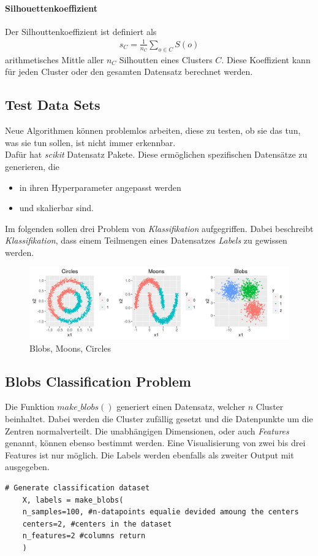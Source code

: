 \paragraph{Silhouettenkoeffizient}
Der Silhouttenkoeffizient ist definiert als 
\begin{align}
	s_C = \frac{1}{n_C}\sum_{o\in C}S(o)
\end{align}
arithmetisches Mittle aller $n_C$ Silhoutten eines Clusters $C$.
Diese Koeffizient kann für jeden Cluster oder den gesamten Datensatz berechnet werden.

\subsection{Test Data Sets}
Neue Algorithmen können problemlos arbeiten, diese zu testen, ob sie das tun, was sie tun sollen, ist nicht immer erkennbar. \\

Dafür hat \textit{scikit} Datensatz Pakete. Diese ermöglichen spezifischen Datensätze zu generieren, die 
\begin{itemize}
	\item in ihren Hyperparameter angepasst werden
	\item und skalierbar sind.
\end{itemize}

Im folgenden sollen drei Problem von \textit{Klassifikation} aufgegriffen. Dabei beschreibt \textit{Klassifikation}, dass einem Teilmengen eines Datensatzes \textit{Labels} zu gewissen werden. 

\begin{figure}[H]
	\centering
	\includegraphics[scale = 0.8]{attachment/chapter_1/Scc160}
	\caption{Blobs, Moons, Circles}
\end{figure} 


\subsection{Blobs Classification Problem}
Die Funktion $make\_ blobs()$ generiert einen Datensatz, welcher $n$ Cluster beinhaltet. Dabei werden die Cluster zufällig gesetzt und die Datenpunkte um die Zentren normalverteilt. Die unabhängigen Dimensionen, oder auch \textit{Features} genannt, können ebenso bestimmt werden. Eine Visualisierung von zwei bis drei Features ist nur möglich. Die Labels werden ebenfalls als zweiter Output mit ausgegeben.
\begin{lstlisting}[style=Python]
	# Generate classification dataset
	X, labels = make_blobs(
	n_samples=100, #n-datapoints equalie devided amoung the centers
	centers=2, #centers in the dataset
	n_features=2 #columns return
	)
\end{lstlisting}


